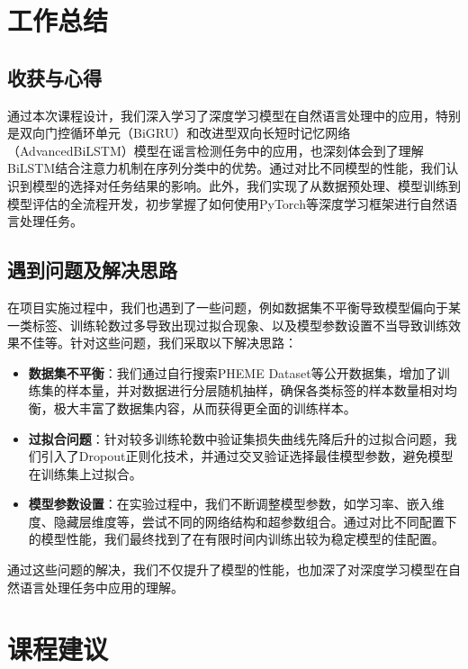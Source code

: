 \chapter{工作总结}

\section{收获与心得}

通过本次课程设计，我们深入学习了深度学习模型在自然语言处理中的应用，特别是双向门控循环单元（BiGRU）和改进型双向长短时记忆网络（AdvancedBiLSTM）模型在谣言检测任务中的应用，也深刻体会到了理解BiLSTM结合注意力机制在序列分类中的优势。通过对比不同模型的性能，我们认识到模型的选择对任务结果的影响。此外，我们实现了从数据预处理、模型训练到模型评估的全流程开发，初步掌握了如何使用PyTorch等深度学习框架进行自然语言处理任务。

\section{遇到问题及解决思路}

在项目实施过程中，我们也遇到了一些问题，例如数据集不平衡导致模型偏向于某一类标签、训练轮数过多导致出现过拟合现象、以及模型参数设置不当导致训练效果不佳等。针对这些问题，我们采取以下解决思路：
\begin{itemize}
    \item \textbf{数据集不平衡}：我们通过自行搜索PHEME Dataset等公开数据集，增加了训练集的样本量，并对数据进行分层随机抽样，确保各类标签的样本数量相对均衡，极大丰富了数据集内容，从而获得更全面的训练样本。
    \item \textbf{过拟合问题}：针对较多训练轮数中验证集损失曲线先降后升的过拟合问题，我们引入了Dropout正则化技术，并通过交叉验证选择最佳模型参数，避免模型在训练集上过拟合。
    \item \textbf{模型参数设置}：在实验过程中，我们不断调整模型参数，如学习率、嵌入维度、隐藏层维度等，尝试不同的网络结构和超参数组合。通过对比不同配置下的模型性能，我们最终找到了在有限时间内训练出较为稳定模型的佳配置。
\end{itemize}

\vspace{1em}
通过这些问题的解决，我们不仅提升了模型的性能，也加深了对深度学习模型在自然语言处理任务中应用的理解。
    
\chapter{课程建议}

